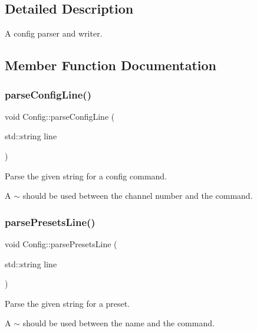 \subsection{Detailed Description}
A config parser and writer. 

\subsection{Member Function Documentation}
\mbox{\label{classConfig_a9a85fd4fb07775bccf974a83645159e2}} 
\subsubsection{\texorpdfstring{parse\+Config\+Line()}{parseConfigLine()}}
{\footnotesize\ttfamily void Config\+::parse\+Config\+Line (\begin{DoxyParamCaption}\item[{std\+::string}]{line }\end{DoxyParamCaption})\hspace{0.3cm}{\ttfamily [private]}}



Parse the given string for a config command. 

A $\sim$ should be used between the channel number and the command. \mbox{\label{classConfig_a9f578681efe13ea4c4baca735f6b3c6e}} 
\subsubsection{\texorpdfstring{parse\+Presets\+Line()}{parsePresetsLine()}}
{\footnotesize\ttfamily void Config\+::parse\+Presets\+Line (\begin{DoxyParamCaption}\item[{std\+::string}]{line }\end{DoxyParamCaption})\hspace{0.3cm}{\ttfamily [private]}}



Parse the given string for a preset. 

A $\sim$ should be used between the name and the command. 

